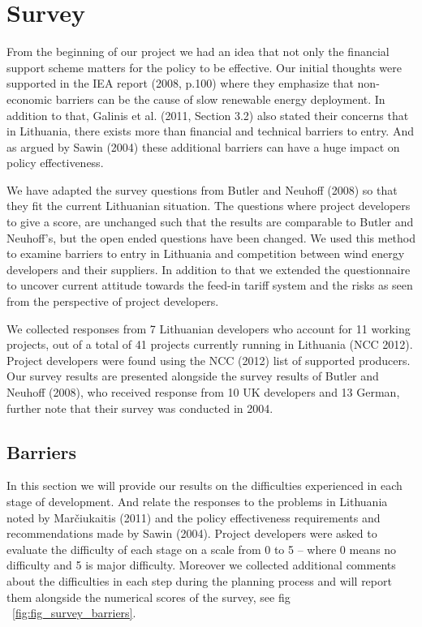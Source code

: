 \documentclass[a4paper, 12pt]{article}
\begin{document}
\section{Survey}
From the beginning of our project we had an idea that not only the financial support scheme matters for the policy to be effective. Our initial thoughts were supported in the IEA report (2008, p.100) where they emphasize that non-economic barriers can be the cause of slow renewable energy deployment. In addition to that, Galinis et al. (2011, Section 3.2) also stated their concerns that in Lithuania, there exists more than financial and technical barriers to entry. And as argued by Sawin (2004) these additional barriers can have a huge impact on policy effectiveness.

We have adapted the survey questions from Butler and Neuhoff (2008) so that they fit the current Lithuanian situation. The questions where project developers to give a score, are unchanged such that the results are comparable to Butler and Neuhoff’s, but the open ended questions have been changed. We used this method to examine barriers to entry in Lithuania and competition between wind energy developers and their suppliers. In addition to that we extended the questionnaire to uncover current attitude towards the feed-in tariff system and the risks as seen from the perspective of project developers.
 
We collected responses from 7 Lithuanian developers who account for 11 working projects, out of a total of 41 projects currently running in Lithuania (NCC 2012). Project developers were found using the NCC (2012) list of supported producers. Our survey results are presented alongside the survey results of Butler and Neuhoff (2008), who received response from 10 UK developers and 13 German, further note that their survey was conducted in 2004.

\subsection{Barriers}
In this section we will provide our results on the difficulties experienced in each stage of development. And relate the responses to the problems in Lithuania noted by Marčiukaitis (2011) and the policy effectiveness requirements and recommendations made by Sawin (2004). Project developers were asked to evaluate the difficulty of each stage on a scale from 0 to 5 – where 0 means no difficulty and 5 is major difficulty. Moreover we collected additional comments about the difficulties in each step during the planning process and will report them alongside the numerical scores of the survey, see fig ~\ref{fig:fig_survey_barriers}.
\end{document}
